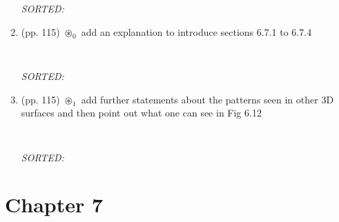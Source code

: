 \documentclass[12pt]{article}
\begin{document}
\begin{enumerate}
\begin{verbatim}
	\end{verbatim}
	\textit{
	SORTED:  
	}
	\\


\item  (pp. 115) $\circledast_0$ 
	add an explanation to introduce 
	sections 6.7.1 to 6.7.4
	\begin{verbatim}
	
	\end{verbatim}
	\textit{
	SORTED:  
	}
	\\



\item  (pp. 115) $\circledast_1$ 
	add further statements about the 
	patterns seen in other 3D surfaces and then
	point out what one can see in Fig 6.12
	\begin{verbatim}
	
	\end{verbatim}
	\textit{
	SORTED:  
	}
	\\















\end{enumerate}






\section{Chapter 7}
\end{document}
